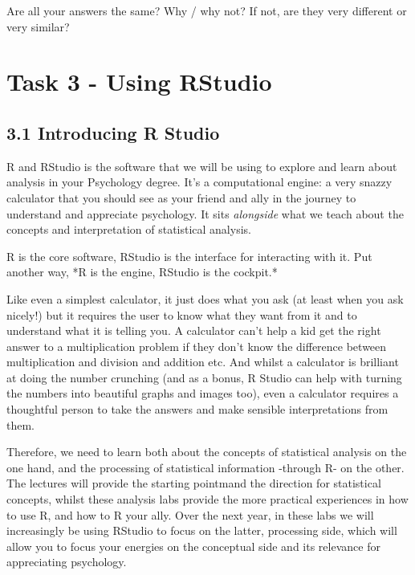 \documentclass[
]{book}
\begin{document}
Are all your answers the same? Why / why not? If not, are they very different or very similar?

\hypertarget{task-3---using-rstudio}{%
\section{Task 3 - Using RStudio}\label{task-3---using-rstudio}}

\hypertarget{introducing-r-studio}{%
\subsection{3.1 Introducing R Studio}\label{introducing-r-studio}}

R and RStudio is the software that we will be using to explore and learn about analysis in your Psychology degree. It's a computational engine: a very snazzy calculator that you should see as your friend and ally in the journey to understand and appreciate psychology. It sits \emph{alongside} what we teach about the concepts and interpretation of statistical analysis.

R is the core software, RStudio is the interface for interacting with it. Put another way, *R is the engine, RStudio is the cockpit.*

Like even a simplest calculator, it just does what you ask (at least when you ask nicely!) but it requires the user to know what they want from it and to understand what it is telling you. A calculator can't help a kid get the right answer to a multiplication problem if they don't know the difference between multiplication and division and addition etc. And whilst a calculator is brilliant at doing the number crunching (and as a bonus, R Studio can help with turning the numbers into beautiful graphs and images too), even a calculator requires a thoughtful person to take the answers and make sensible interpretations from them.

Therefore, we need to learn both about the concepts of statistical analysis on the one hand, and the processing of statistical information -through R- on the other. The lectures will provide the starting pointmand the direction for statistical concepts, whilst these analysis labs provide the more practical experiences in how to use R, and how to R your ally. Over the next year, in these labs we will increasingly be using RStudio to focus on the latter, processing side, which will allow you to focus your energies on the conceptual side and its relevance for appreciating psychology.
\end{document}
